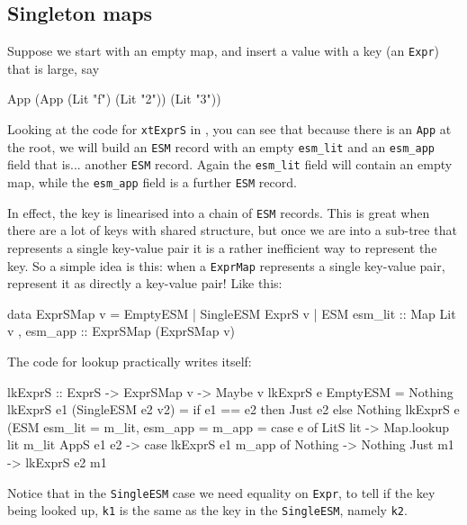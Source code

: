 \documentclass[format=sigplan]{acmart}
\theoremstyle{theorem}
\theoremstyle{definition}
\theoremstyle{remark}
\begin{document}
\subsection{Singleton maps} \label{sec:singleton}

Suppose we start with an empty map, and insert a value
with a key (an \lstinline{Expr}) that is large, say
\begin{code}
  App (App (Lit "f") (Lit "2")) (Lit "3"))
\end{code}
Looking at the code
for \lstinline{xtExprS} in , you can see that
because there is an \lstinline{App} at the root, we will build an
\lstinline{ESM} record with an empty \lstinline{esm_lit} and an
\lstinline{esm_app} field that is... another \lstinline{ESM}
record.  Again the \lstinline{esm_lit} field will contain an
empty map, while the \lstinline{esm_app} field is a further \lstinline{ESM} record.

In effect, the key is linearised into a chain of \lstinline{ESM} records.
This is great when there are a lot of keys with shared structure, but
once we are into a sub-tree that represents a single key-value pair it is
a rather inefficient way to represent the key.  So a simple idea is this:
when a \lstinline{ExprMap} represents a single key-value pair, represent it
as directly a key-value pair!  Like this:
\begin{code}
  data ExprSMap v = EmptyESM
                  | SingleESM ExprS v
                  | ESM { esm_lit :: Map Lit v
                        , esm_app :: ExprSMap (ExprSMap v) }
\end{code}
The code for lookup practically writes itself:
\begin{code}
  lkExprS :: ExprS -> ExprSMap v -> Maybe v
  lkExprS e EmptyESM
    = Nothing
  lkExprS e1 (SingleESM e2 v2)
  = if e1 == e2 then Just e2
                else Nothing
  lkExprS e (ESM { esm_lit = m_lit, esm_app = m_app }
    = case e of
       LitS lit   -> Map.lookup lit m_lit
       AppS e1 e2 -> case lkExprS e1 m_app of
                       Nothing -> Nothing
                       Just m1 -> lkExprS e2 m1
\end{code}
Notice that in the \lstinline{SingleESM} case we need equality on \lstinline{Expr},
to tell if the key being looked up, \lstinline{k1} is the same as the key in
the \lstinline{SingleESM}, namely \lstinline{k2}.
\end{document}
